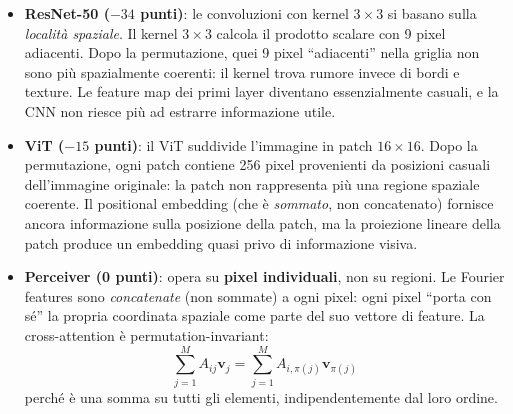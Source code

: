 \documentclass[12pt,a4paper]{article}
\begin{document}
\begin{proofbox}
\begin{itemize}
    \item \textbf{ResNet-50 ($-34$ punti)}: le convoluzioni con kernel $3 \times 3$ si basano sulla \emph{localit\`a spaziale}. Il kernel $3 \times 3$ calcola il prodotto scalare con 9 pixel adiacenti. Dopo la permutazione, quei 9 pixel ``adiacenti'' nella griglia non sono pi\`u spazialmente coerenti: il kernel trova rumore invece di bordi e texture. Le feature map dei primi layer diventano essenzialmente casuali, e la CNN non riesce pi\`u ad estrarre informazione utile.
    \item \textbf{ViT ($-15$ punti)}: il ViT suddivide l'immagine in patch $16 \times 16$. Dopo la permutazione, ogni patch contiene 256 pixel provenienti da posizioni casuali dell'immagine originale: la patch non rappresenta pi\`u una regione spaziale coerente. Il positional embedding (che \`e \emph{sommato}, non concatenato) fornisce ancora informazione sulla posizione della patch, ma la proiezione lineare della patch produce un embedding quasi privo di informazione visiva.
    \item \textbf{Perceiver (0 punti)}: opera su \textbf{pixel individuali}, non su regioni. Le Fourier features sono \emph{concatenate} (non sommate) a ogni pixel: ogni pixel ``porta con s\'e'' la propria coordinata spaziale come parte del suo vettore di feature. La cross-attention \`e permutation-invariant:
    \[
        \sum_{j=1}^{M} A_{ij} \mathbf{v}_j = \sum_{j=1}^{M} A_{i,\pi(j)} \mathbf{v}_{\pi(j)}
    \]
    perch\'e \`e una somma su tutti gli elementi, indipendentemente dal loro ordine.
\end{itemize}
\end{proofbox}
\end{document}

